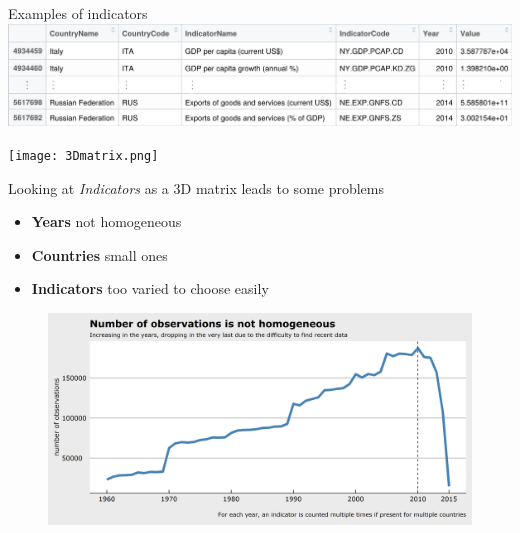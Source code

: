 \documentclass[9pt]{beamer}
\begin{document}
\begin{frame}{Examples of indicators}
\centering
\includegraphics [width=\textwidth]{indicators.png}
\end{frame}


\usebackgroundtemplate{}
\begin{frame}
	\centering
	\texttt{[image: 3Dmatrix.png]}
\end{frame}

\begin{frame}
Looking at \textit{Indicators} as a 3D matrix leads to some problems
\begin{itemize} [<+->]
\item \textbf{Years}  not homogeneous
\item \textbf{Countries}  small ones
\item \textbf{Indicators}  too varied to choose easily
\end{itemize}
\end{frame}

\begin{frame}
\begin{figure}
\centering
\includegraphics[width=\textwidth]{plot0001.png}
\end{figure}
\end{frame}
\end{document}
